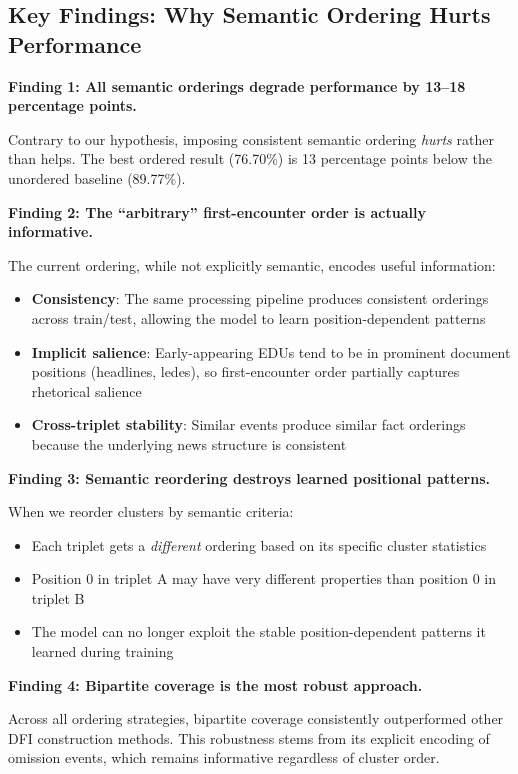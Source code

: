 \documentclass[12pt,a4paper]{article}
\begin{document}
\subsection{Key Findings: Why Semantic Ordering Hurts Performance}

\textbf{Finding 1: All semantic orderings degrade performance by 13--18 percentage points.}

Contrary to our hypothesis, imposing consistent semantic ordering \textit{hurts} rather than
helps. The best ordered result (76.70\%) is 13 percentage points below the unordered baseline (89.77\%).

\textbf{Finding 2: The ``arbitrary'' first-encounter order is actually informative.}

The current ordering, while not explicitly semantic, encodes useful information:
\begin{itemize}
\item \textbf{Consistency}: The same processing pipeline produces consistent orderings across
      train/test, allowing the model to learn position-dependent patterns
\item \textbf{Implicit salience}: Early-appearing EDUs tend to be in prominent document positions
      (headlines, ledes), so first-encounter order partially captures rhetorical salience
\item \textbf{Cross-triplet stability}: Similar events produce similar fact orderings because
      the underlying news structure is consistent
\end{itemize}

\textbf{Finding 3: Semantic reordering destroys learned positional patterns.}

When we reorder clusters by semantic criteria:
\begin{itemize}
\item Each triplet gets a \textit{different} ordering based on its specific cluster statistics
\item Position 0 in triplet A may have very different properties than position 0 in triplet B
\item The model can no longer exploit the stable position-dependent patterns it learned during training
\end{itemize}

\textbf{Finding 4: Bipartite coverage is the most robust approach.}

Across all ordering strategies, bipartite coverage consistently outperformed other DFI
construction methods. This robustness stems from its explicit encoding of omission events,
which remains informative regardless of cluster order.
\end{document}
